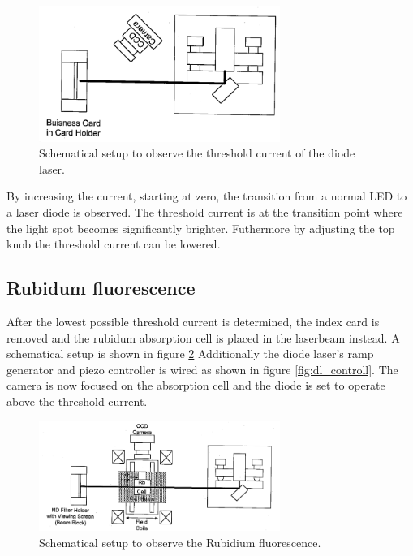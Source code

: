 \begin{figure}
  \centering
  \includegraphics[width=0.7\textwidth]{setup1.png}
  \caption{Schematical setup to observe the threshold current of the diode laser.\cite{V61}}
  \label{fig:setup1}
\end{figure}
By increasing the current, starting at zero, the transition from
a normal LED to a laser diode is observed.
The threshold current is at the
transition point where the light spot becomes significantly brighter.
Futhermore by adjusting the top knob the threshold current can be lowered.


\subsection{Rubidum fluorescence}
\label{subsec:RB_fluorescence}

After the lowest possible threshold current is determined, the
index card is removed and
the rubidum absorption cell
is placed in the laserbeam instead.
A schematical setup is shown in figure \ref{fig:setup2}
Additionally the diode laser's ramp generator and  piezo controller is wired as shown in figure \ref{fig:dl_controll}.
The camera is now
focused on the absorption cell and
the diode is set to operate above the threshold current.
\begin{figure}
  \centering
  \includegraphics[width=0.7\textwidth]{setup2.png}
  \caption{Schematical setup to observe the Rubidium fluorescence.\cite{V61}}
  \label{fig:setup2}
\end{figure}

